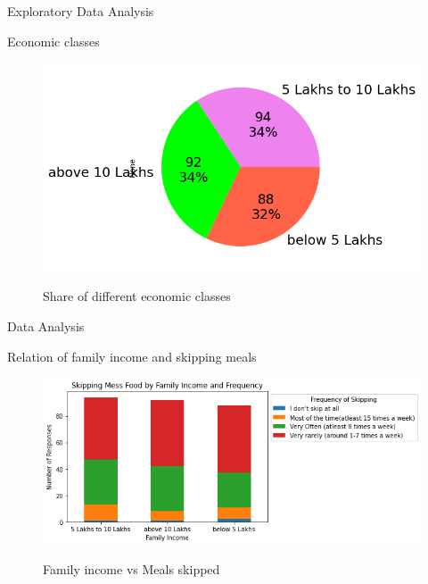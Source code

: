 \documentclass{beamer}
\begin{document}
\begin{frame}{Exploratory Data Analysis}
\begin{block}{Economic classes}
\begin{figure}
      \centering
    \caption{Share of different economic classes}
    \includegraphics[scale = 0.55]{pie_income.png}  
    \label{fig:side-by-side}
\end{figure}
\end{block}
\end{frame}
\begin{frame}{Data Analysis}
\begin{block}{Relation of family income and skipping meals}
\begin{figure}
      \centering
    \caption{Family income vs Meals skipped }
    \includegraphics[scale = 0.55]{Meal Skipping - Family Income Seg chart.png}  
    \label{income_seg}
\end{figure}
\end{block}
\end{frame}
\end{document}

